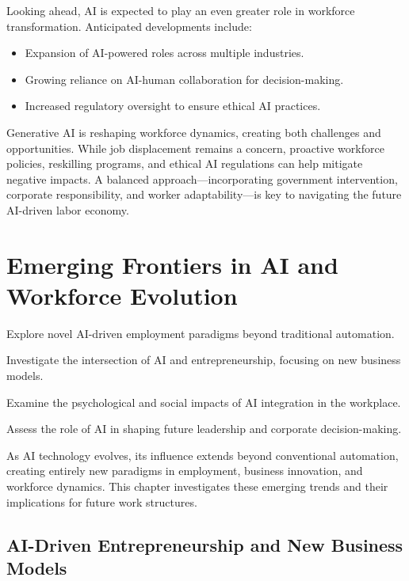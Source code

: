 \documentclass[a4paper,headinclude=on,footinclude=on,12pt,oneside]{scrbook}
\begin{document}

Looking ahead, AI is expected to play an even greater role in workforce transformation. Anticipated developments include:
\begin{itemize}
	\item Expansion of AI-powered roles across multiple industries.
	\item Growing reliance on AI-human collaboration for decision-making.
	\item Increased regulatory oversight to ensure ethical AI practices.
\end{itemize}


Generative AI is reshaping workforce dynamics, creating both challenges and opportunities. While job displacement remains a concern, proactive workforce policies, reskilling programs, and ethical AI regulations can help mitigate negative impacts. A balanced approach—incorporating government intervention, corporate responsibility, and worker adaptability—is key to navigating the future AI-driven labor economy.


\chapter{Emerging Frontiers in AI and Workforce Evolution}

\begin{arrows}
	\item Explore novel AI-driven employment paradigms beyond traditional automation.
	\item Investigate the intersection of AI and entrepreneurship, focusing on new business models.
	\item Examine the psychological and social impacts of AI integration in the workplace.
	\item Assess the role of AI in shaping future leadership and corporate decision-making.
\end{arrows}


As AI technology evolves, its influence extends beyond conventional automation, creating entirely new paradigms in employment, business innovation, and workforce dynamics. This chapter investigates these emerging trends and their implications for future work structures.

\section{AI-Driven Entrepreneurship and New Business Models}
\end{document}
